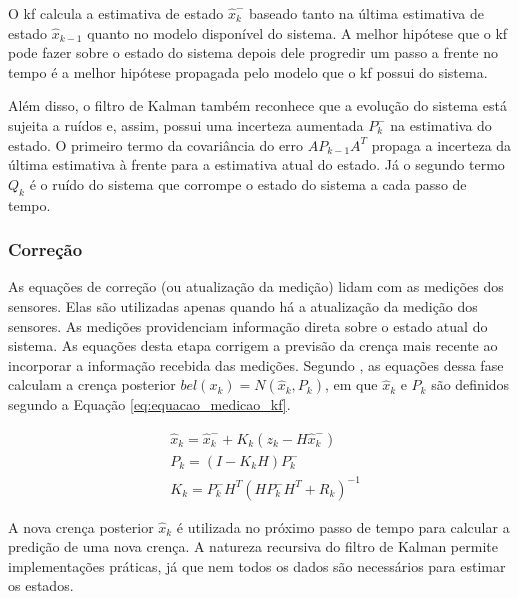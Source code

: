\documentclass[acronym, symbols, table, deposito]{fei}
\begin{document}
				O \acrshort{kf} calcula a estimativa de estado $\hat{x}_{k}^{-}$ baseado tanto na última estimativa de estado $\hat{x}_{k-1}$ quanto no modelo disponível do sistema. A melhor hipótese que o \acrshort{kf} pode fazer sobre o estado do sistema depois dele progredir um passo a frente no tempo é a melhor hipótese propagada pelo modelo que o \acrshort{kf} possui do sistema.
				
				Além disso, o filtro de Kalman também reconhece que a evolução do sistema está sujeita a ruídos e, assim, possui uma incerteza aumentada $P_{k}^{-}$ na estimativa do estado. O primeiro termo da covariância do erro $AP_{k-1}A^{T}$ propaga a incerteza da última estimativa à frente para a estimativa atual do estado. Já o segundo termo $Q_{k}$ é o ruído do sistema que corrompe o estado do sistema a cada passo de tempo.
			
			\subsubsection{Correção}
			
				As equações de correção (ou atualização da medição) lidam com as medições dos sensores. Elas são utilizadas apenas quando há a atualização da medição dos sensores. As medições providenciam informação direta sobre o estado atual do sistema. As equações desta etapa corrigem a previsão da crença mais recente ao incorporar a informação recebida das medições. Segundo \textcite{thrun2002probabilistic}, as equações dessa fase calculam a crença posterior $bel(x_k) = N(\hat{x}_{k},P_{k})$, em que $\hat{x}_{k}$ e $P_{k}$ são definidos segundo a Equação \eqref{eq:equacao_medicao_kf}.
				
				\begin{equation} \label{eq:equacao_medicao_kf}
					\begin{split}
						&\hat{x}_{k} = \hat{x}_{k}^{-} + K_{k}(z_k - H\hat{x}_{k}^{-}) \\
						&P_{k} = (I - K_kH)P_{k}^{-} \\
						&K_k =  P_{k}^{-}H^T(HP_{k}^{-}H^T + R_k)^{-1}
					\end{split}
				\end{equation}
			
				A nova crença posterior $\hat{x}_{k}$ é utilizada no próximo passo de tempo para calcular a predição de uma nova crença. A natureza recursiva do filtro de Kalman permite implementações práticas, já que nem todos os dados são necessários para estimar os estados.
				
\end{document}
